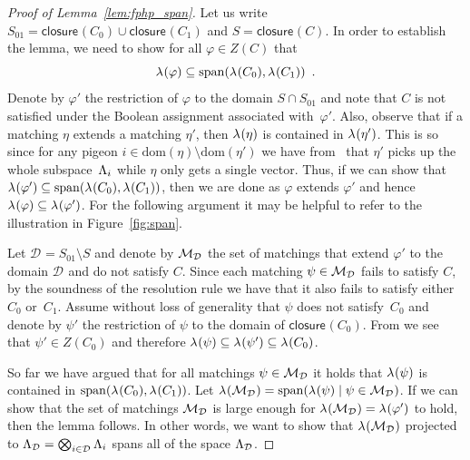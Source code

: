 \documentclass{article}
\newcommand{\eqperiod}{\enspace .}
\newcommand{\reffig}[1]{Figure~\ref{#1}}
\newcommand{\reflem}[1]{Lemma~\ref{#1}}
\newcommand{\linspace}[1][]{\ensuremath \Lambda_{{#1}}}
\newcommand{\linmap}[1][]{\ensuremath \lambda_{{#1}}}
\newcommand{\linmapof}[2][]{\linmap[#1](#2)}
\newcommand{\closure}[2][]{\mathsf{closure}_{{#1}}(#2)}
\newcommand{\diffclosure}[1][]{D_{{#1}}}
\renewcommand{\diffclosure}[1][]{\mathcal{D}_{{#1}}}
\newcommand{\matcha}{\varphi}
\newcommand{\matchb}{\varphi'}
\newcommand{\matchc}{\psi}
\newcommand{\matchd}{\psi'}
\newcommand{\matche}{\eta}
\newcommand{\matchf}{\eta'}
\newcommand{\matchings}[1][]{\ensuremath \mathcal{M}_{{#1}}}
\newcommand{\spans}[1]{\mathrm{span} ( #1 )}
\newcommand{\dom}[1]{\mathrm{dom} ( #1 )}
\newcommand{\bigtensor}{\ensuremath \bigotimes}
\numberwithin{equation}{section}
\begin{document}
\begin{proof}[Proof of \reflem{lem:fphp_span}]
  Let us write 
  $S_{01} = \closure{C_0} \cup \closure{C_1}$ and $S = \closure{C}$.
  In order to establish
  the lemma,
  we need to show   for all $\matcha \in Z(C)$ that
  \begin{equation}
    \linmapof{\matcha} \subseteq 
    \spans{ \linmapof{C_0}, \linmapof{C_1} } 
    \eqperiod
  \end{equation}
  Denote by $\matchb$ the restriction of $\matcha$ to the domain 
  $S \cap S_{01}$
  and note
  that $C$ is not satisfied
  under the Boolean assignment associated with~$\matchb$.
  Also, observe that  if a matching $\matche$ extends a matching $\matchf$, then 
  $\linmapof{\matche}$ is contained in $\linmapof{\matchf}$. This is so since
  for any pigeon
  $i \in \dom{\matche} \setminus \dom{\matchf}$
  we have  from~
  that $\matchf$ picks up the whole subspace~$\linspace[i]$
  while $\matche$ only gets a single vector.  
  Thus, if we can show that
  $\linmapof{\matchb} \subseteq \spans{ \linmapof{C_0}, \linmapof{C_1}
  }$, then we are done as $\matcha$ extends $\matchb$ and hence
  $\linmapof{\matcha} \subseteq \linmapof{\matchb}$. For the following
  argument it may be helpful to refer to the illustration in
  \reffig{fig:span}.
  

  Let $\diffclosure = S_{01} \setminus S$ and denote by 
  $\matchings[\diffclosure]$ 
  the set of matchings
  that extend $\matchb$ to the domain $\diffclosure$ and do not satisfy $C$. 
  Since each matching $\matchc \in \matchings[\diffclosure]$ 
  fails to satisfy $C$,
  by the soundness of the resolution rule we have that it also fails
  to satisfy either     
  $C_0$ or~$C_1$. Assume without loss of generality that $\matchc$
  does not satisfy~$C_0$ and denote
  by $\matchd$ the restriction of $\matchc$ to the domain of
  $\closure{C_0}$. 
  From  we see that
  $\matchd \in Z(C_0)$ 
  and therefore
  $\linmapof{\matchc} \subseteq \linmapof{\matchd} \subseteq
  \linmapof{C_0}$.
  
  So far we have argued that for all matchings $\matchc \in \matchings[\diffclosure]$ 
  it holds that
  $\linmapof{\matchc}$ is contained in $\spans{\linmapof{C_0}, \linmapof{C_1}}$.
  Let $\linmapof{\matchings[\diffclosure]} = 
  \spans{\linmapof{\matchc} \mid \matchc \in \matchings[\diffclosure]}$.
  If we can show that the set of matchings
  $\matchings[\diffclosure]$ 
  is large enough for 
  $\linmapof{\matchings[\diffclosure]} = \linmapof{\matchb}$
  to hold, then the lemma follows.
  In other words, we want to show that
  $\linmapof{\matchings[\diffclosure]}$ 
  projected to 
  $\linspace[\diffclosure] = 
  \bigtensor_{i \in \diffclosure} \linspace[i]$
  spans all of the space $\linspace[\diffclosure]$.


\end{proof}
\end{document}
